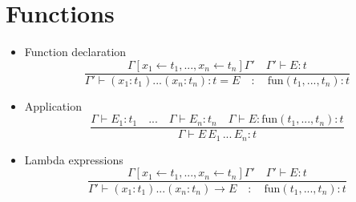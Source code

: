 \documentclass[]{article}
\begin{document}
	\section{Functions}
		\begin{itemize}
			\item Function declaration
			\[
			\frac{\Gamma[x_1 \leftarrow t_1, ..., x_n \leftarrow t_n]\Gamma' \quad \Gamma' \vdash E: t}{\Gamma' \vdash (x_1: t_1)...(x_n: t_n): t = E \quad:\quad \text{fun}(t_1,...,t_n):t}
			\]
			\item Application
			\[
			\frac{\Gamma \vdash E_1: t_1 \quad ... \quad \Gamma \vdash E_n: t_n \quad \Gamma \vdash E: \text{fun}(t_1,...,t_n):t}{\Gamma \vdash E \, E_1 \, ... \, E_n:t}
			\]
			\item Lambda expressions
			\[
			\frac{\Gamma[x_1 \leftarrow t_1, ..., x_n \leftarrow t_n]\Gamma' \quad \Gamma' \vdash E: t}{\Gamma' \vdash (x_1: t_1)...(x_n: t_n) \rightarrow E \quad:\quad \text{fun}(t_1,...,t_n):t}
			\]
		\end{itemize}
		
\end{document}
